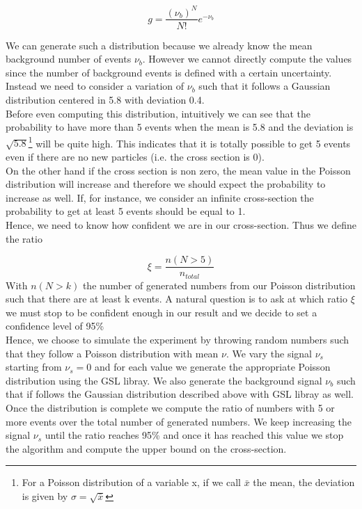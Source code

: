 \documentclass[10 pt]{article}
\numberwithin{equation}{section}
\begin{document}
\begin{multicols}{2}
\begin{equation}
 g = \frac{(\nu_b)^N}{N!} e^{-\nu_b}
\end{equation}

We can generate such a distribution because we already know the mean background number of events $\nu_b$. However we cannot directly compute the values since the number of background events is defined with a certain uncertainty. Instead we need to consider a variation of $\nu_b$ such that it follows a Gaussian distribution centered in 5.8 with deviation 0.4.\\
Before even computing this distribution, intuitively we can see that the probability to have more than 5 events when the mean is 5.8 and the deviation is $\sqrt{5.8}$\footnote{For a Poisson distribution of a variable x, if we call $\bar x$ the mean, the deviation is given by $\sigma = \sqrt{\bar x}$} will be quite high. This indicates that it is totally possible to get 5 events even if there are no new particles (i.e. the cross section is 0).\\
On the other hand if the cross section is non zero, the mean value in the Poisson distribution will increase and therefore we should expect the probability to increase as well. If, for instance, we consider an infinite cross-section the probability to get at least 5 events should be equal to 1.\\
Hence, we need to know how confident we are in our cross-section. Thus we define the ratio

\begin{equation}
\xi = \frac{n(N > 5)}{n_{total}}
\end{equation}
With $n(N > k)$ the number of generated numbers from our Poisson distribution such that there are at least k events. A natural question is to ask at which ratio $\xi$ we must stop to be confident enough in our result and we decide to set a confidence level of 95\% \\
Hence, we choose to simulate the experiment by throwing random numbers such that they follow a Poisson distribution with mean $\nu$. We vary the signal $\nu_s$ starting from $\nu_s = 0$ and for each value we generate the appropriate Poisson distribution using the GSL libray\cite{glouglou}. We also generate the background signal $\nu_b$ such that if follows the Gaussian distribution described above with GSL libray as well\cite{OhLeGamin}. Once the distribution is complete we compute the ratio of numbers with 5 or more events over the total number of generated numbers. We keep increasing the signal $\nu_s$ until the ratio reaches 95\% and once it has reached this value we stop the algorithm and compute the upper bound on the cross-section.

\end{multicols}
\end{document}
